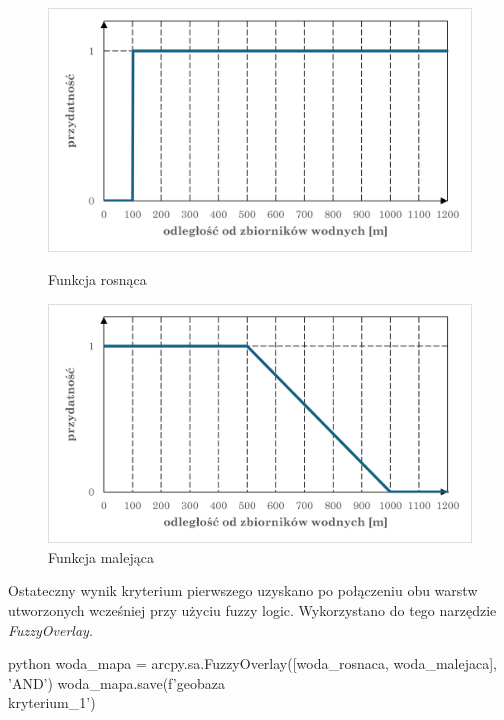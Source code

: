 \documentclass{article}
\begin{document}
\begin{figure}[H]
    \centering
    \begin{minipage}{0.48\textwidth}
        \centering
        \includegraphics[width=\linewidth]{img/kryterium1-wykres-rosnaca.png}
        \caption{Funkcja rosnąca}
    \end{minipage}
    \begin{minipage}{0.48\textwidth}
        \centering
        \includegraphics[width=\linewidth]{img/kryterium1-wykres-malejaca.png}
        \caption{Funkcja malejąca}
    \end{minipage}
\end{figure}
\vspace{10pt}

Ostateczny wynik kryterium pierwszego uzyskano po połączeniu obu warstw utworzonych wcześniej przy użyciu fuzzy logic. Wykorzystano do tego narzędzie \textit{FuzzyOverlay}.
\vspace{5pt}

\begin{mintedbox}{python}
woda_mapa = arcpy.sa.FuzzyOverlay([woda_rosnaca, woda_malejaca], 'AND')
woda_mapa.save(f'{geobaza}\\kryterium_1')
\end{mintedbox}
\vspace{5pt}
\end{document}
